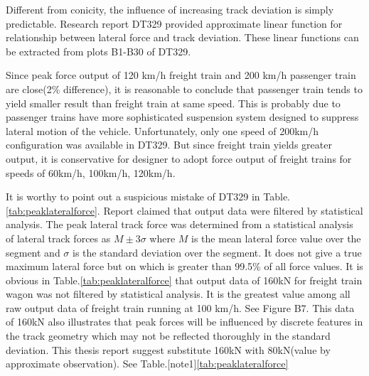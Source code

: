 Different from conicity, the influence of increasing track deviation is simply predictable. Research report DT329 provided approximate linear function for relationship between lateral force and track deviation. These linear functions can be extracted from plots B1-B30 of DT329.

Since peak force output of 120 km/h freight train and 200 km/h passenger train are close(2\% difference), it is reasonable to conclude that passenger train tends to yield smaller result than freight train at same speed. This is probably due to passenger trains have more sophisticated suspension system designed to suppress lateral motion of the vehicle. Unfortunately, only one speed of 200km/h configuration was available in DT329. But since freight train yields greater output, it is conservative for designer to adopt force output of freight trains for speeds of 60km/h, 100km/h, 120km/h.

It is worthy to point out a suspicious mistake of DT329 in Table.\ref{tab:peaklateralforce}. Report claimed that output data were filtered by statistical analysis. The peak lateral track force was determined from a statistical analysis of lateral track forces as $M \pm 3\sigma$ where $M$ is the mean lateral force value over the segment and $\sigma$ is the standard deviation over the segment. It does not give a true maximum lateral force but on which is greater than 99.5\% of all force values. It is obvious in Table.\ref{tab:peaklateralforce} that output data of 160kN for freight train wagon was not filtered by statistical analysis. It is the greatest value among all raw output data of freight train running at 100 km/h. See Figure B7. This data of 160kN also illustrates that 
peak forces will be influenced by discrete features in the track geometry which may not be reflected thoroughly in the standard deviation. This thesis report suggest substitute 160kN with 80kN(value by approximate observation). See Table.[note1]\ref{tab:peaklateralforce}

